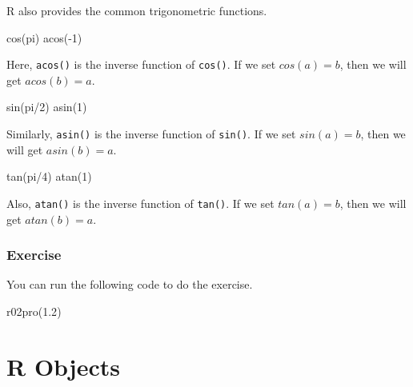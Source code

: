 \documentclass[
]{book}
\newenvironment{Shaded}{\begin{snugshade}}{\end{snugshade}}
\newcommand{\DecValTok}[1]{\textcolor[rgb]{0.00,0.00,0.81}{#1}}
\newcommand{\FloatTok}[1]{\textcolor[rgb]{0.00,0.00,0.81}{#1}}
\newcommand{\FunctionTok}[1]{\textcolor[rgb]{0.00,0.00,0.00}{#1}}
\newcommand{\NormalTok}[1]{#1}
\newcommand{\SpecialCharTok}[1]{\textcolor[rgb]{0.00,0.00,0.00}{#1}}
\begin{document}
R also provides the common trigonometric functions.

\begin{Shaded}
\begin{Highlighting}[]
\FunctionTok{cos}\NormalTok{(pi)}
\FunctionTok{acos}\NormalTok{(}\SpecialCharTok{{-}}\DecValTok{1}\NormalTok{)}
\end{Highlighting}
\end{Shaded}

Here, \texttt{acos()} is the inverse function of \texttt{cos()}. If we set \(cos(a) = b\), then we will get \(acos(b) = a\).

\begin{Shaded}
\begin{Highlighting}[]
\FunctionTok{sin}\NormalTok{(pi}\SpecialCharTok{/}\DecValTok{2}\NormalTok{)}
\FunctionTok{asin}\NormalTok{(}\DecValTok{1}\NormalTok{)}
\end{Highlighting}
\end{Shaded}

Similarly, \texttt{asin()} is the inverse function of \texttt{sin()}. If we set \(sin(a) = b\), then we will get \(asin(b) = a\).

\begin{Shaded}
\begin{Highlighting}[]
\FunctionTok{tan}\NormalTok{(pi}\SpecialCharTok{/}\DecValTok{4}\NormalTok{)}
\FunctionTok{atan}\NormalTok{(}\DecValTok{1}\NormalTok{)}
\end{Highlighting}
\end{Shaded}

Also, \texttt{atan()} is the inverse function of \texttt{tan()}. If we set \(tan(a) = b\), then we will get \(atan(b) = a\).

\hypertarget{exercise}{%
\subsection{Exercise}\label{exercise}}

You can run the following code to do the exercise.

\begin{Shaded}
\begin{Highlighting}[]
\FunctionTok{r02pro}\NormalTok{(}\FloatTok{1.2}\NormalTok{)}
\end{Highlighting}
\end{Shaded}

\hypertarget{r-objects}{%
\chapter{R Objects}\label{r-objects}}
\end{document}
